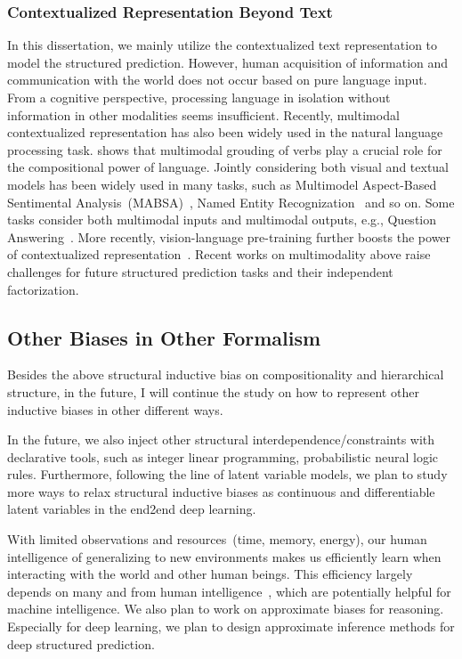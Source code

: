 \subsubsection{Contextualized Representation Beyond Text}
\label{sssec:future:beyond-text}
In this dissertation, we mainly utilize the contextualized text
representation to model the structured prediction. However, human
acquisition of information and communication with the world does not
occur based on pure language input. From a cognitive perspective,
processing language in isolation without information in other
modalities seems insufficient. Recently, multimodal contextualized
representation has also been widely used in the natural language
processing task. \citet{beinborn-etal-2018-multimodal} shows that
multimodal grouding of verbs play a crucial role for the compositional
power of language. Jointly considering both visual and textual models
has been widely used in many tasks, such as Multimodel Aspect-Based
Sentimental Analysis~(MABSA)~\cite{ju2021joint}, Named Entity
Recognization~\cite{zhang2021multi} and so on. Some tasks consider
both multimodal inputs and multimodal outputs, e.g., Question
Answering~\cite{singh-etal-2021-mimoqa}. More recently,
vision-language pre-training further boosts the power of
contextualized
representation~\cite{lu2019vilbert,ling-etal-2022-vision}. Recent
works on multimodality above raise challenges for future structured
prediction tasks and their independent factorization.

\subsection{Other Biases in Other Formalism}
\label{ssec:future:rep-bias-ways}

Besides the above structural inductive bias on compositionality and
hierarchical structure, in the future, I will continue the study on how
to represent other inductive biases in other different ways.

In the
future, we also inject other structural interdependence/constraints
with declarative tools, such as integer linear programming,
probabilistic neural logic rules. Furthermore, following the line of
latent variable models, we plan to study more ways to relax structural
inductive biases as continuous and differentiable latent variables in
the end2end deep learning.

 With limited observations and
resources~(time, memory, energy), our human intelligence of
generalizing to new environments makes us efficiently learn when
interacting with the world and other human beings. This efficiency
largely depends on many  and  from human intelligence~\cite{Gershman2021WhatMU}, which are
potentially helpful for machine intelligence. We also plan to work
on approximate biases for reasoning. Especially for deep learning, we
plan to design approximate inference methods for deep structured
prediction.

